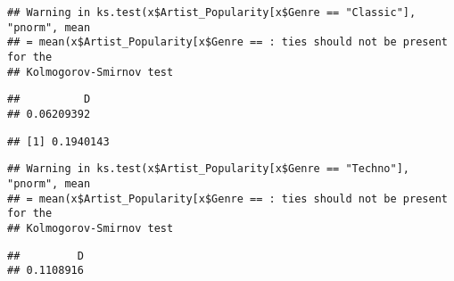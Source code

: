\documentclass[
]{article}
\newenvironment{Shaded}{\begin{snugshade}}{\end{snugshade}}
\newcommand{\DataTypeTok}[1]{\textcolor[rgb]{0.13,0.29,0.53}{#1}}
\newcommand{\FloatTok}[1]{\textcolor[rgb]{0.00,0.00,0.81}{#1}}
\newcommand{\KeywordTok}[1]{\textcolor[rgb]{0.13,0.29,0.53}{\textbf{#1}}}
\newcommand{\NormalTok}[1]{#1}
\newcommand{\OperatorTok}[1]{\textcolor[rgb]{0.81,0.36,0.00}{\textbf{#1}}}
\newcommand{\StringTok}[1]{\textcolor[rgb]{0.31,0.60,0.02}{#1}}
\begin{document}
\begin{verbatim}
## Warning in ks.test(x$Artist_Popularity[x$Genre == "Classic"], "pnorm", mean
## = mean(x$Artist_Popularity[x$Genre == : ties should not be present for the
## Kolmogorov-Smirnov test
\end{verbatim}

\begin{verbatim}
##          D 
## 0.06209392
\end{verbatim}

\begin{Shaded}
\end{Shaded}

\begin{verbatim}
## [1] 0.1940143
\end{verbatim}

\begin{Shaded}
\end{Shaded}

\begin{verbatim}
## Warning in ks.test(x$Artist_Popularity[x$Genre == "Techno"], "pnorm", mean
## = mean(x$Artist_Popularity[x$Genre == : ties should not be present for the
## Kolmogorov-Smirnov test
\end{verbatim}

\begin{verbatim}
##         D 
## 0.1108916
\end{verbatim}

\begin{Shaded}
\end{Shaded}
\end{document}
